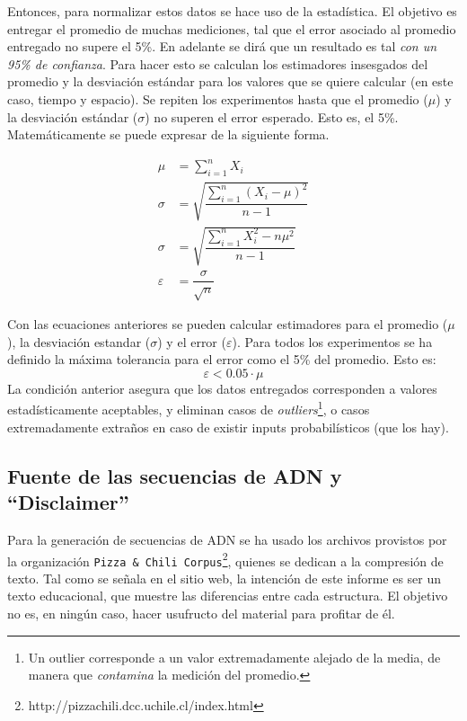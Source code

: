 \documentclass[12pt,letterpaper]{report}
\begin{document}
Entonces, para normalizar estos datos se hace uso de la estadística. El objetivo es entregar el promedio de muchas mediciones, tal que el error asociado al promedio entregado no supere el 5\%. En adelante se dirá que un resultado es tal \emph{con un 95\% de confianza}. Para hacer esto se calculan los estimadores insesgados del promedio y la desviación estándar para los valores que se quiere calcular (en este caso, tiempo y espacio). Se repiten los experimentos hasta que el promedio ($\mu$) y la desviación estándar ($\sigma$) no superen el error esperado. Esto es, el 5\%. Matemáticamente se puede expresar de la siguiente forma.

\begin{align}
  \mu &= \sum_{i=1}^n X_i \nonumber \\
  \sigma &= \sqrt{\dfrac{\sum_{i=1}^n (X_i - \mu)^{2}}{n-1}} \nonumber \\
  \sigma &= \sqrt{\dfrac{\sum_{i=1}^n X_i^2 - n\mu^2}{n-1}} \nonumber \\
  \varepsilon &= \dfrac{\sigma}{\sqrt{n}} \nonumber
\end{align}

Con las ecuaciones anteriores se pueden calcular estimadores para el promedio ($\mu$), la desviación estandar ($\sigma$) y el error ($\varepsilon$). Para todos los experimentos se ha definido la máxima tolerancia para el error como el 5\% del promedio. Esto es:
$$\varepsilon < 0.05\cdot \mu$$
La condición anterior asegura que los datos entregados corresponden a valores estadísticamente aceptables, y eliminan casos de \emph{outliers}\footnote{Un outlier corresponde a un valor extremadamente alejado de la media, de manera que \emph{contamina} la medición del promedio.}, o casos extremadamente extraños en caso de existir inputs probabilísticos (que los hay).

\subsection{Fuente de las secuencias de ADN y ``Disclaimer''}
\label{subsec:fuente_textos}

Para la generación de secuencias de ADN se ha usado los archivos provistos por la organización \texttt{Pizza \& Chili Corpus}\footnote{http://pizzachili.dcc.uchile.cl/index.html}, quienes se dedican a la compresión de texto. Tal como se señala en el sitio web, la intención de este informe es ser un texto educacional, que muestre las diferencias entre cada estructura. El objetivo no es, en ningún caso, hacer usufructo del material para profitar de él.\\
\end{document}
